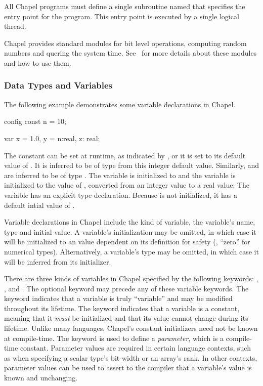 All Chapel programs must define a single subroutine named
 that specifies the entry point for the program.  
This entry point is executed by a single logical thread.

Chapel provides standard modules for bit level operations, computing
random numbers and quering the system time.  See~
for more details about these modules and how to use them.

\subsubsection{Data Types and Variables}
\label{Data_Types_and_Variables}

The following example demonstrates some variable declarations in Chapel.
\begin{chapel}
config const n = 10;

var x = 1.0,
    y = n:real,
    z: real;
\end{chapel}

The constant  can be set at runtime, as indicated by , 
or it is set to its default value of .  It is inferred to be of 
type  from this integer default value.  Similarly,  and 
 are inferred to be of type .  The variable 
is initialized to  and the variable  is initialized to
the value of , converted from an integer value to a real value.
The variable  has an explicit type declaration.  
Because  is not initialized, it has a default intial value of .

Variable declarations in Chapel include the kind of variable, the variable's
name, type and initial value.  A variable's initialization may be omitted, 
in which case it will be initialized to an value dependent on its definition for 
safety (\eg, ``zero'' for numerical types).  Alternatively, a variable's type 
may be omitted, in which case it will be inferred from its
initializer.

There are three kinds of variables in Chapel specified by the following 
keywords:  , ,
and .  The optional keyword  may precede
any of these variable keywords.  The  keyword indicates that a
variable is truly ``variable'' and may be modified throughout its
lifetime.  The  keyword indicates that a variable is a
constant, meaning that it \emph{must} be initialized and that its
value cannot change during its lifetime.  Unlike many languages,
Chapel's constant initializers need not be known at compile-time.  The
 keyword is used to define a \emph{parameter}, which is a
compile-time constant.  Parameter values are
required in certain language contexts, such as when specifying a
scalar type's bit-width or an array's rank.  In other contexts,
parameter values can be used to assert to the compiler that a
variable's value is known and unchanging.

